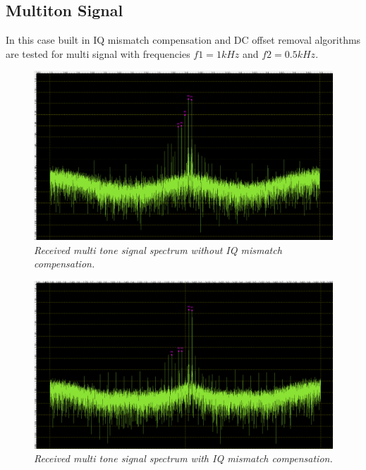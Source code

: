 \documentclass[en,printmode]{mgr}
\begin{document}
   	\subsection*{Multiton Signal}
   		In this case built in IQ mismatch compensation and DC offset removal algorithms are
	 	tested for multi signal with frequencies $f1=1kHz$ and $f2=0.5kHz$.
   		 	\begin{figure}[H]
    			\centering
   				\includegraphics[width=\textwidth]{plots/real_multi_off.png}
   		 		\caption{\textit{Received multi tone signal spectrum without IQ mismatch compensation.}}
   		 	\end{figure}
   		 	\begin{figure}[H]
    			\centering
   				\includegraphics[width=\textwidth]{plots/real_multi_on.png}
   		 		\caption{\textit{Received multi tone signal spectrum with IQ mismatch compensation.}}
   		 	\end{figure}
   	 \newpage	
\end{document}
